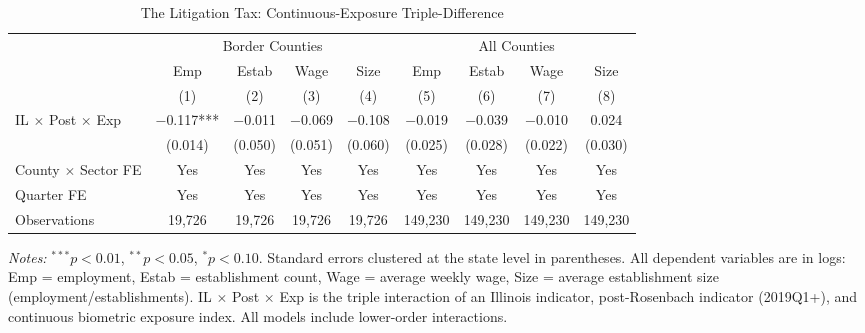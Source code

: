 \begin{table}[htbp]
\centering
\caption{The Litigation Tax: Continuous-Exposure Triple-Difference}
\label{tab:main}
\begin{adjustbox}{max width=\textwidth}
\begin{tabular}{lcccccccc}
\toprule
 & \multicolumn{4}{c}{Border Counties} & \multicolumn{4}{c}{All Counties} \\
\cmidrule(lr){2-5} \cmidrule(lr){6-9}
 & Emp & Estab & Wage & Size & Emp & Estab & Wage & Size \\
 & (1) & (2) & (3) & (4) & (5) & (6) & (7) & (8) \\
\midrule
IL $\times$ Post $\times$ Exp & $-$0.117*** & $-$0.011 & $-$0.069 & $-$0.108 & $-$0.019 & $-$0.039 & $-$0.010 & 0.024 \\
 & (0.014) & (0.050) & (0.051) & (0.060) & (0.025) & (0.028) & (0.022) & (0.030) \\
\midrule
County $\times$ Sector FE & Yes & Yes & Yes & Yes & Yes & Yes & Yes & Yes \\
Quarter FE & Yes & Yes & Yes & Yes & Yes & Yes & Yes & Yes \\
Observations & 19,726 & 19,726 & 19,726 & 19,726 & 149,230 & 149,230 & 149,230 & 149,230 \\
\bottomrule
\end{tabular}
\end{adjustbox}
\begin{tablenotes}[flushleft]
\small
\item \textit{Notes:} $^{***}p<0.01$, $^{**}p<0.05$, $^{*}p<0.10$. Standard errors clustered at the state level in parentheses. All dependent variables are in logs: Emp = employment, Estab = establishment count, Wage = average weekly wage, Size = average establishment size (employment/establishments). IL $\times$ Post $\times$ Exp is the triple interaction of an Illinois indicator, post-Rosenbach indicator (2019Q1+), and continuous biometric exposure index. All models include lower-order interactions.
\end{tablenotes}
\end{table}
